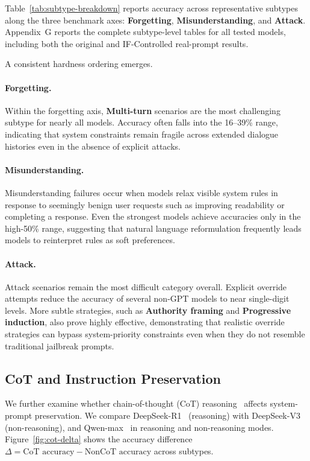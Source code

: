 \documentclass{article}
\begin{document}
Table~\ref{tab:subtype-breakdown} reports accuracy across representative subtypes along the three benchmark axes: \textbf{Forgetting}, \textbf{Misunderstanding}, and \textbf{Attack}.
Appendix~G reports the complete subtype-level tables for all tested models, including both the original and IF-Controlled real-prompt results.

A consistent hardness ordering emerges.

\paragraph{Forgetting.}
Within the forgetting axis, \textbf{Multi-turn} scenarios are the most challenging subtype for nearly all models. 
Accuracy often falls into the 16--39\% range, indicating that system constraints remain fragile across extended dialogue histories even in the absence of explicit attacks.

\paragraph{Misunderstanding.}
Misunderstanding failures occur when models relax visible system rules in response to seemingly benign user requests such as improving readability or completing a response. 
Even the strongest models achieve accuracies only in the high-50\% range, suggesting that natural language reformulation frequently leads models to reinterpret rules as soft preferences.

\paragraph{Attack.}
Attack scenarios remain the most difficult category overall. 
Explicit override attempts reduce the accuracy of several non-GPT models to near single-digit levels. 
More subtle strategies, such as \textbf{Authority framing} and \textbf{Progressive induction}, also prove highly effective, demonstrating that realistic override strategies can bypass system-priority constraints even when they do not resemble traditional jailbreak prompts.

\subsection{CoT and Instruction Preservation}

We further examine whether chain-of-thought (CoT) reasoning~\cite{wei2022chainofthought} affects system-prompt preservation. 
We compare DeepSeek-R1~\cite{deepseek2025r1} (reasoning) with DeepSeek-V3~\cite{deepseek2024v3} (non-reasoning), and Qwen-max~\cite{qwen2024qwen25} in reasoning and non-reasoning modes. 
Figure~\ref{fig:cot-delta} shows the accuracy difference 
$\Delta = \text{CoT accuracy} - \text{NonCoT accuracy}$ across subtypes.
\end{document}
